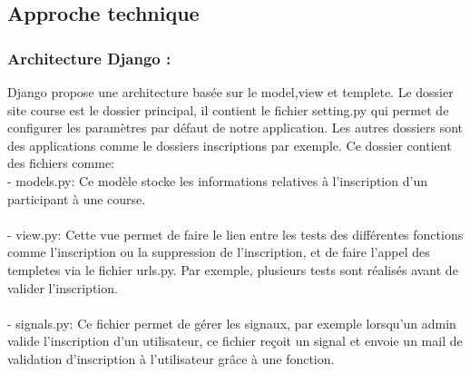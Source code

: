 \documentclass[12pt]{article} %
\begin{document}
	\subsection{Approche technique}
		\subsubsection{Architecture Django :} 
            Django propose une architecture basée sur le model,view et templete.  Le dossier site course est le dossier principal, il contient le fichier setting.py qui permet de configurer les paramètres par défaut de notre application. Les autres dossiers sont des applications comme le dossiers inscriptions par exemple. Ce dossier contient des fichiers comme: \\
            - models.py:  Ce modèle stocke les informations relatives à l'inscription d'un participant à une course. \\ \\
            - view.py: Cette vue permet de faire le lien entre les tests des différentes fonctions comme l’inscription ou la suppression de l’inscription, et de faire l'appel des templetes via le fichier urls.py. Par exemple, plusieurs tests sont réalisés avant de valider l'inscription. \\ \\
            - signals.py: Ce fichier permet de gérer les signaux, par exemple lorsqu'un admin valide l’inscription d’un utilisateur, ce fichier reçoit un signal et envoie un mail de validation d'inscription à l’utilisateur grâce à une fonction.
\end{document}
